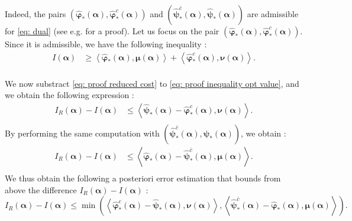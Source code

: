 \documentclass{article}
\def\aalpha{\boldsymbol{\alpha}}
\def\pphi{\boldsymbol{\varphi}}
\def\ppsi{\boldsymbol{\psi}}
\def\mmu{\boldsymbol{\mu}}
\def\nnu{\boldsymbol{\nu}}
\begin{document}
%
Indeed, the pairs $(\widehat{\pphi}_*(\aalpha), \widehat{\pphi}^{c}_*(\aalpha))$ and $(\widehat{\ppsi}^{\bar{c}}_*(\aalpha), \widehat{\ppsi}_*(\aalpha))$ are admissible for \eqref{eq: dual} (see e.g. \cite{santambrogio2015optimal} for a proof).
Let us focus on the pair $(\widehat{\pphi}_*(\aalpha), \widehat{\pphi}^{c}_*(\aalpha))$. Since it is admissible, we have the following inequality : 
%
\begin{equation}\label{eq: proof inequality opt value}
    \begin{array}{ll}
         I(\aalpha) &\geq \left\langle \widehat{\pphi}_*(\aalpha), \mmu(\aalpha) \right\rangle +
                        \left\langle \widehat{\pphi}^{c}_*(\aalpha), \nnu(\aalpha) \right\rangle.  \\
    \end{array}
\end{equation}

We now substract \eqref{eq: proof reduced cost} to \eqref{eq: proof inequality opt value}, and we obtain the following expression :
%
\begin{equation}
    \begin{array}{ll}
     I_R(\aalpha)   - I(\aalpha)  &\leq \left\langle  \widehat{\ppsi}_*(\aalpha)-  \widehat{\pphi}^{c}_*(\aalpha), \nnu(\aalpha) \right\rangle.   \\
    \end{array}
\end{equation}
%
By performing the same computation with $(\widehat{\ppsi}^{\bar{c}}_*(\aalpha), \widehat{\ppsi}_*(\aalpha))$, we obtain :
%
\begin{equation}
    \begin{array}{ll}
         I_R(\aalpha) - I(\aalpha)  &\leq \left\langle \widehat{\pphi}_*(\aalpha)- \widehat{\ppsi}^{\bar{c}}_*(\aalpha), \mmu(\aalpha) \right\rangle.   \\
    \end{array}
\end{equation}
%
We thus obtain the following a posteriori error estimation that bounds from above the difference $ I_R(\aalpha)  - I(\aalpha)$ :
\begin{equation}
     I_R(\aalpha)  - I(\aalpha) \leq \min \left(\left\langle \widehat{\pphi}^{c}_*(\aalpha) - \widehat{\ppsi}_*(\aalpha), \nnu(\aalpha) \right\rangle, \left\langle \widehat{\ppsi}^{\bar{c}}_*(\aalpha) - \widehat{\pphi}_*(\aalpha), \mmu(\aalpha) \right\rangle  \right).   
\end{equation}
\end{document}
